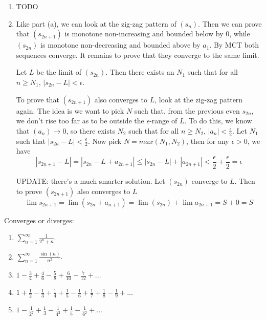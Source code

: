 \documentclass{oxmathproblems}
\begin{document}
\begin{questions}
\begin{solution}
\begin{enumerate}[label=(\alph*)]
    \item TODO
    
    \item Like part (a), we can look at the zig-zag pattern of $(s_{n})$. Then we can prove that $(s_{2n+1})$ is monotone non-increasing and bounded below by 0, while $(s_{2n})$ is monotone
    non-decreasing and bounded above by $a_{1}$. By MCT both sequences converge. It remains to prove that they converge to the same limit.

    Let $L$ be the limit of $(s_{2n})$. Then there exists an $N_{1}$ such that for all $n \geq N_{1}$, $|s_{2n} - L| < \epsilon$.

    To prove that $(s_{2n+1})$ also converges to $L$, look at the zig-zag pattern again. The idea is we want to pick $N$ such that, from the previous even $s_{2n}$, we don't
    rise too far as to be outside the $\epsilon$-range of $L$. To do this, we know that $(a_{n}) \rightarrow 0$, so there exists $N_{2}$ such that for all $n \geq N_{2}$, $|a_{n}| < \frac{\epsilon}{2}$.
    Let $N_{1}$ such that $|s_{2n} - L| < \frac{\epsilon}{2}$. Now pick $N=max(N_{1}, N_{2})$, then for any $\epsilon > 0$, we have 
    \[|s_{2n+1} - L| = |s_{2n} - L + a_{2n+1}| \leq |s_{2n} - L| + |a_{2n+1}| < \frac{\epsilon}{2} + \frac{\epsilon}{2} = \epsilon \]

    UPDATE: there's a much smarter solution. Let $(s_{2n})$ converge to $L$. Then to prove $(s_{2n+1})$ also converges to $L$
    \[\lim s_{2n+1} = \lim (s_{2n} + a_{n+1}) = \lim (s_{2n}) + \lim a_{2n+1} = S + 0 = S\]
  \end{enumerate}
\end{solution}

\miquestion Converges or diverges:
\begin{enumerate}[label=(\alph*)]
  \item $\sum_{n=1}^{\infty}\frac{1}{2^{n} + n}$.
  \item $\sum_{n=1}^{\infty}\frac{\sin(n)}{n^{2}}$.
  \item $1 - \frac{3}{4} + \frac{4}{6} - \frac{5}{8} + \frac{6}{10} - \frac{7}{12} + ...$
  \item $1 + \frac{1}{2} - \frac{1}{3} + \frac{1}{4} + \frac{1}{5} - \frac{1}{6} + \frac{1}{7} + \frac{1}{8} - \frac{1}{9} + ...$
  \item $1 - \frac{1}{2^2} + \frac{1}{3} - \frac{1}{4^2} + \frac{1}{5} - \frac{1}{6^2} + ...$
\end{enumerate}


\end{questions}
\end{document}

